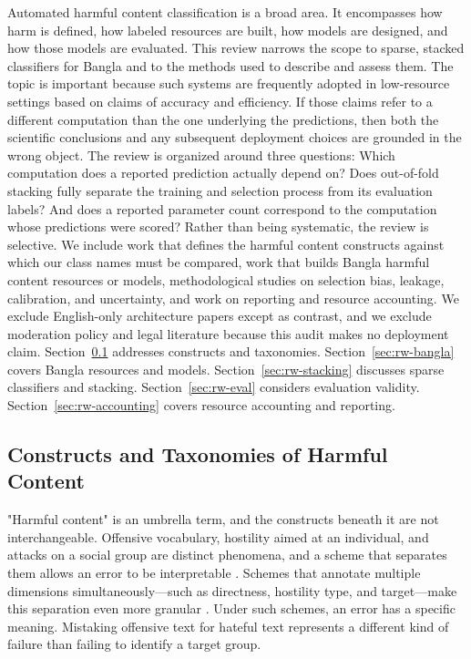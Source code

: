 \documentclass[runningheads]{llncs}
\begin{document}
Automated harmful content classification is a broad area. It encompasses how harm is defined, how labeled resources are built, how models are designed, and how those models are evaluated. This review narrows the scope to sparse, stacked classifiers for Bangla and to the methods used to describe and assess them. The topic is important because such systems are frequently adopted in low-resource settings based on claims of accuracy and efficiency. If those claims refer to a different computation than the one underlying the predictions, then both the scientific conclusions and any subsequent deployment choices are grounded in the wrong object. The review is organized around three questions: Which computation does a reported prediction actually depend on? Does out-of-fold stacking fully separate the training and selection process from its evaluation labels? And does a reported parameter count correspond to the computation whose predictions were scored? Rather than being systematic, the review is selective. We include work that defines the harmful content constructs against which our class names must be compared, work that builds Bangla harmful content resources or models, methodological studies on selection bias, leakage, calibration, and uncertainty, and work on reporting and resource accounting. We exclude English-only architecture papers except as contrast, and we exclude moderation policy and legal literature because this audit makes no deployment claim. Section~\ref{sec:rw-constructs} addresses constructs and taxonomies. Section~\ref{sec:rw-bangla} covers Bangla resources and models. Section~\ref{sec:rw-stacking} discusses sparse classifiers and stacking. Section~\ref{sec:rw-eval} considers evaluation validity. Section~\ref{sec:rw-accounting} covers resource accounting and reporting.

\subsection{Constructs and Taxonomies of Harmful Content}
\label{sec:rw-constructs}
"Harmful content" is an umbrella term, and the constructs beneath it are not interchangeable. Offensive vocabulary, hostility aimed at an individual, and attacks on a social group are distinct phenomena, and a scheme that separates them allows an error to be interpretable . Schemes that annotate multiple dimensions simultaneously—such as directness, hostility type, and target—make this separation even more granular . Under such schemes, an error has a specific meaning. Mistaking offensive text for hateful text represents a different kind of failure than failing to identify a target group.
\end{document}
